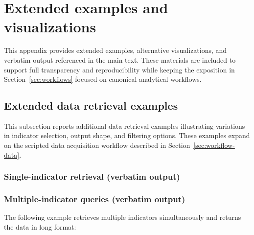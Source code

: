 \documentclass[bib]{statapress}
\begin{document}
\setcounter{figure}{0}
\setcounter{table}{0}
\renewcommand{\thefigure}{\thesection\arabic{figure}}
\renewcommand{\thetable}{\thesection\arabic{table}}

\section{Extended examples and visualizations}\label{app:examples}

This appendix provides extended examples, alternative visualizations, and
verbatim output referenced in the main text. These materials are included to
support full transparency and reproducibility while keeping the exposition in
Section~\ref{sec:workflows} focused on canonical analytical workflows.

\subsection{Extended data retrieval examples}\label{app:examples:data}

This subsection reports additional data retrieval examples illustrating
variations in indicator selection, output shape, and filtering options. These
examples expand on the scripted data acquisition workflow described in
Section~\ref{sec:workflow-data}.

\subsubsection{Single-indicator retrieval (verbatim output)}
\begin{stlog}
\nullskip
\end{stlog}

\subsubsection{Multiple-indicator queries (verbatim output)}
The following example retrieves multiple indicators simultaneously and returns
the data in long format:
\begin{stlog}
\nullskip
\end{stlog}
\end{document}
